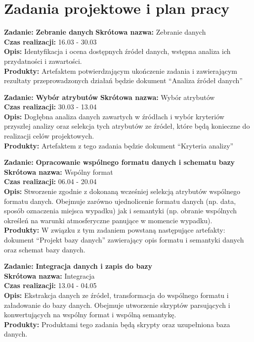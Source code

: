 \section{Zadania projektowe i plan
pracy}\label{zadania-projektowe-i-plan-pracy}

\textbf{Zadanie:} \textbf{Zebranie danych} \textbf{Skrótowa nazwa:}
Zebranie danych\\\textbf{Czas realizacji:} 16.03 - 30.03\\\textbf{Opis:}
Identyfikacja i ocena dostępnych źródeł danych, wstępna analiza ich
przydatności i zawartości.\\\textbf{Produkty:} Artefaktem
potwierdzającym ukończenie zadania i zawierającym rezultaty
przeprowadzonych działań będzie dokument ``Analiza źródeł danych''

\textbf{Zadanie:} \textbf{Wybór atrybutów} \textbf{Skrótowa nazwa:}
Wybór atrybutów\\\textbf{Czas realizacji:} 30.03 - 13.04\\\textbf{Opis:}
Dogłębna analiza danych zawartych w źródłach i wybór kryteriów przyszłej
analizy oraz selekcja tych atrybutów ze źródeł, które będą konieczne do
realizacji celów projektowych.\\\textbf{Produkty:} Artefaktem z tego
zadania będzie dokument ``Kryteria analizy''

\textbf{Zadanie:} \textbf{Opracowanie wspólnego formatu danych i
schematu bazy}\\\textbf{Skrótowa nazwa:} Wspólny format\\\textbf{Czas
realizacji:} 06.04 - 20.04\\\textbf{Opis:} Stworzenie zgodnie z dokonaną
wcześniej selekcją atrybutów wspólnego formatu danych. Obejmuje zarówno
ujednolicenie formatu danych (np. data, sposób oznaczenia miejsca
wypadku) jak i semantyki (np. obranie wspólnych określeń na warunki
atmosferyczne panujące w momencie wypadku).\\\textbf{Produkty:} W
związku z tym zadaniem powstaną następujące artefakty: dokument
``Projekt bazy danych'' zawierający opis formatu i semantyki danych oraz
schemat bazy danych.

\textbf{Zadanie:} \textbf{Integracja danych i zapis do
bazy}\\\textbf{Skrótowa nazwa:} Integracja\\\textbf{Czas realizacji:}
13.04 - 04.05\\\textbf{Opis:} Ekstrakcja danych ze źródeł, transformacja
do wspólnego formatu i załadowanie do bazy danych. Obejmuje utworzenie
skryptów parsujących i konwertujących na wspólny format i wspólną
semantykę.\\\textbf{Produkty:} Produktami tego zadania będą skrypty oraz
uzupełniona baza danych.


